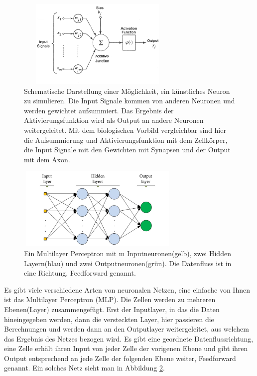 \begin{figure}
	\centering
	\includegraphics[width=0.7\textwidth, height=160px]{pics/aneuron.png}	
	\caption{Schematische Darstellung einer Möglichkeit, ein künstliches Neuron zu simulieren. Die Input Signale kommen von anderen Neuronen und werden gewichtet aufsummiert. Das Ergebnis der Aktivierungsfunktion wird als Output an andere Neuronen weitergeleitet. Mit dem biologischen Vorbild vergleichbar sind hier die Aufsummierung und Aktivierungsfunktion mit dem Zellkörper, die Input Signale mit den Gewichten mit Synapsen und der Output mit dem Axon.\cite{bib:aneuron}}
	\label{img:aneuron}
\end{figure}
\begin{figure}
	\centering
	\includegraphics[width=0.7\textwidth, height=150px]{pics/mlp.jpg}	
	\caption{Ein Multilayer Perceptron mit m Inputneuronen(gelb), zwei Hidden Layern(blau) und zwei Outputneuronen(grün). Die Datenfluss ist in eine Richtung, Feedforward genannt.  \cite{bib:mlp}}
	\label{img:mlp}
\end{figure}
Es gibt viele verschiedene Arten von neuronalen Netzen, eine einfache von Ihnen ist das Multilayer Perceptron (MLP). Die Zellen werden zu mehreren Ebenen(Layer) zusammengefügt. Erst der Inputlayer, in das die Daten hineingegeben werden, dann die versteckten Layer, hier passieren die Berechnungen und werden dann an den Outputlayer weitergeleitet, aus welchem das Ergebnis des Netzes bezogen wird. Es gibt eine geordnete Datenflussrichtung, eine Zelle erhält ihren Input von jeder Zelle der vorigenen Ebene und gibt ihren Output entsprechend an jede Zelle der folgenden Ebene weiter, Feedforward genannt. Ein solches Netz sieht man in Abbildung \ref{img:mlp}.  
